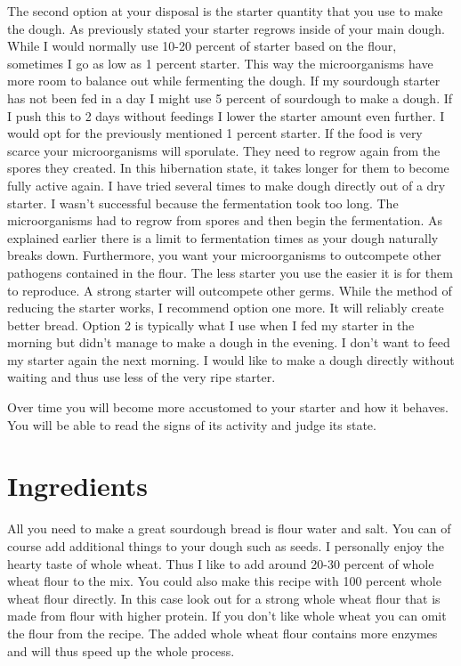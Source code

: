 The second option at your disposal is the starter quantity that
you use to make the dough. As previously stated your starter
regrows inside of your main dough. While I would normally use
10-20 percent of starter based on the flour, sometimes I go
as low as 1 percent starter. This way the microorganisms have
more room to balance out while fermenting the dough. If my sourdough
starter has not been fed in a day I might use 5 percent of sourdough
to make a dough.  If I push this to 2 days without feedings
I lower the starter amount even further. I would opt for the
previously mentioned 1 percent starter. If the food is very scarce
your microorganisms will sporulate. They need to regrow again
from the spores they created. In this hibernation state, it takes
longer for them to become fully active again. I have tried
several times to make dough directly out of a dry starter.
I wasn't successful because the fermentation took too long.
The microorganisms had to regrow from spores and then begin
the fermentation. As explained earlier there is a limit to
fermentation times as your dough naturally breaks down.
Furthermore, you want your microorganisms to outcompete
other pathogens contained in the flour. The less starter
you use the easier it is for them to reproduce. A strong
starter will outcompete other germs. While the method of
reducing the starter works, I recommend option one more.
It will reliably create better bread. Option 2 is typically
what I use when I fed my starter in the morning but didn't
manage to make a dough in the evening. I don't want to feed
my starter again the next morning. I would like to make a dough
directly without waiting and thus use less of the very ripe starter.

Over time you will become more accustomed to your starter
and how it behaves. You will be able to read the signs of its
activity and judge its state.

\section{Ingredients}

All you need to make a great sourdough bread is flour water and salt. You
can of course add additional things to your dough such as seeds. I personally
enjoy the hearty taste of whole wheat. Thus I like to add around 20-30 percent
of whole wheat flour to the mix. You could also make this recipe with 100 percent
whole wheat flour directly. In this case look out for a strong whole wheat
flour that is made from flour with higher protein. If you don't like whole
wheat you can omit the flour from the recipe. The added whole wheat flour
contains more enzymes and will thus speed up the whole process.

